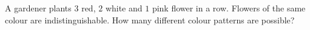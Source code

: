 A gardener plants $3$ red, $2$ white and $1$ pink flower in a row. Flowers of the same colour are indistinguishable. How many different colour patterns are possible?
